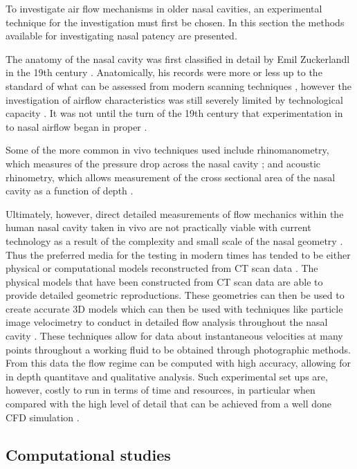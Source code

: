To investigate air flow mechanisms in older nasal cavities, an experimental technique for the investigation must first be chosen. In this section the methods available for investigating nasal patency are presented.

The anatomy of the nasal cavity was first classified in detail by Emil Zuckerlandl in the 19th century \cite{Stammberger1989}. Anatomically, his records were more or less up to the standard of what can be assessed from modern scanning techniques \cite{Stammberger1989}, however the investigation of airflow characteristics was still severely limited by technological capacity \cite{Eccles2000}. It was not until the turn of the 19th century that experimentation in to nasal airflow began in proper \cite{Eccles2000}. 

Some of the more common in vivo techniques used include rhinomanometry, which measures of the pressure drop across the nasal cavity \cite{Hilberg1989}; and acoustic rhinometry, which allows measurement of the cross sectional area of the nasal cavity as a function of depth \cite{Hilberg1989}. 

Ultimately, however, direct detailed measurements of flow mechanics within the human nasal cavity taken in vivo are not practically viable with current technology as a result of the complexity and small scale of the nasal geometry \cite{Doorly2008c}. Thus the preferred media for the testing in modern times has tended to be either physical or computational models reconstructed from CT scan data \cite{Doorly2008c}. The physical models that have been constructed from CT scan data are able to provide detailed geometric reproductions.
These geometries can then be used to create accurate 3D models which can then be used with techniques like particle image velocimetry to conduct in detailed flow analysis throughout the nasal cavity \cite{Chung2008, Kelly2000}.
These techniques allow for data about instantaneous velocities at many points throughout a working fluid to be obtained through photographic methods. From this data the flow regime can be computed with high accuracy, allowing for in depth quantitave and qualitative analysis.
Such experimental set ups are, however, costly to run in terms of time and resources, in particular when compared with the high level of detail that can be achieved from a well done CFD simulation \cite{Ma2009}.


\subsection{Computational studies}  
